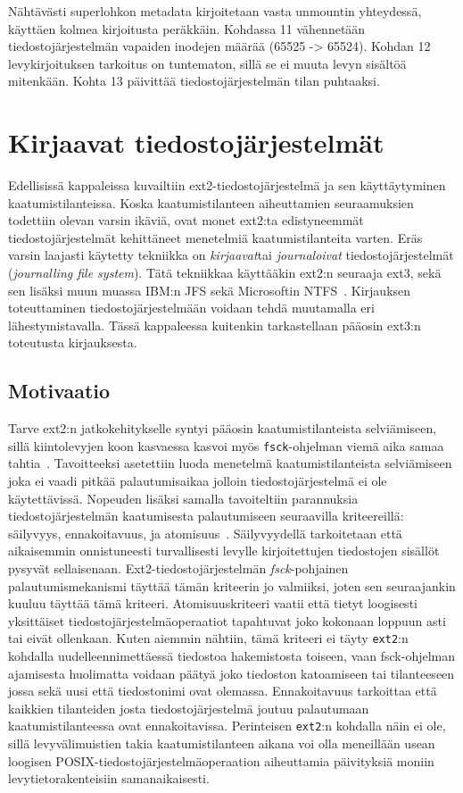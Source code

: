 Nähtävästi superlohkon metadata kirjoitetaan vasta unmountin yhteydessä, käyttäen kolmea kirjoitusta peräkkäin.
Kohdassa 11 vähennetään tiedostojärjestelmän vapaiden inodejen määrää (65525 -> 65524).
Kohdan 12 levykirjoituksen tarkoitus on tuntematon, sillä se ei muuta levyn sisältöä mitenkään.
Kohta 13 päivittää tiedostojärjestelmän tilan puhtaaksi.

\section{Kirjaavat tiedostojärjestelmät}
\label{ChapJournallingFs}
Edellisissä kappaleissa kuvailtiin ext2-tiedostojärjestelmä ja sen käyttäytyminen kaatumistilanteissa.
Koska kaatumistilanteen aiheuttamien seuraamuksien todettiin olevan varsin ikäviä,
ovat monet ext2:ta edistyneemmät tiedostojärjestelmät kehittäneet menetelmiä kaatumistilanteita varten.
Eräs varsin laajasti käytetty tekniikka on \emph{kirjaavat}tai \emph{journaloivat} tiedostojärjestelmät (\emph{journalling file system}).
Tätä tekniikkaa käyttääkin ext2:n seuraaja ext3, sekä sen lisäksi
muun muassa IBM:n JFS sekä Microsoftin NTFS~\cite{JournalingAnalysis}.
Kirjauksen toteuttaminen tiedostojärjestelmään voidaan tehdä muutamalla eri lähestymistavalla.
Tässä kappaleessa kuitenkin tarkastellaan pääosin ext3:n toteutusta kirjauksesta.

\subsection{Motivaatio}

Tarve ext2:n jatkokehitykselle syntyi pääosin kaatumistilanteista selviämiseen,
sillä kiintolevyjen koon kasvaessa kasvoi myös \texttt{fsck}-ohjelman viemä aika samaa tahtia~\cite{Ext2Journal}.
Tavoitteeksi asetettiin luoda menetelmä kaatumistilanteista selviämiseen joka ei vaadi pitkää palautumisaikaa jolloin tiedostojärjestelmä ei ole käytettävissä.
Nopeuden lisäksi samalla tavoiteltiin parannuksia tiedostojärjestelmän kaatumisesta palautumiseen seuraavilla kriteereillä: säilyvyys, ennakoitavuus, ja atomisuus~\cite{Ext2Journal}.
Säilyvyydellä tarkoitetaan että aikaisemmin onnistuneesti turvallisesti levylle kirjoitettujen tiedostojen sisällöt pysyvät sellaisenaan.
Ext2-tiedostojärjestelmän \emph{fsck}-pohjainen palautumismekanismi täyttää tämän kriteerin jo valmiiksi,
joten sen seuraajankin kuuluu täyttää tämä kriteeri.
Atomisuuskriteeri vaatii että tietyt loogisesti yksittäiset tiedostojärjestelmäoperaatiot tapahtuvat
joko kokonaan loppuun asti tai eivät ollenkaan.
Kuten aiemmin nähtiin, tämä kriteeri ei täyty \texttt{ext2}:n kohdalla uudelleennimettäessä tiedostoa hakemistosta toiseen,
vaan fsck-ohjelman ajamisesta huolimatta voidaan päätyä joko tiedoston katoamiseen tai tilanteeseen jossa sekä uusi että tiedostonimi ovat olemassa.
Ennakoitavuus tarkoittaa että kaikkien tilanteiden josta tiedostojärjestelmä joutuu palautumaan kaatumistilanteessa ovat ennakoitavissa.
Perinteisen \texttt{ext2}:n kohdalla näin ei ole,
sillä levyvälimuistien takia kaatumistilanteen aikana voi olla meneillään usean loogisen POSIX-tiedostojärjestelmäoperaation aiheuttamia päivityksiä moniin levytietorakenteisiin samanaikaisesti.

